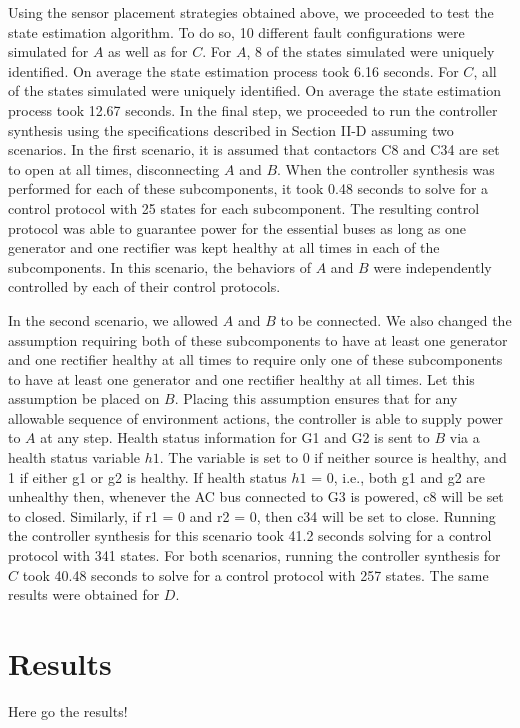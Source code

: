 \documentclass[journal]{IEEEtran}
\begin{document}
Using the sensor placement strategies obtained above, we proceeded to test the state estimation algorithm. To do so, 10 different fault configurations were simulated for $A$ as well as for $C$. For $A$, 8 of the states simulated were uniquely identified. On average the state estimation process took 6.16 seconds. For $C$, all of the states simulated were uniquely identified. On average the state estimation process took 12.67 seconds. In the final step, we proceeded to run the controller synthesis using the specifications described in Section II-D assuming two scenarios. In the first scenario, it is assumed that contactors C8 and C34 are set to open at all times, disconnecting $A$ and $B$. When the controller synthesis was performed for each of these subcomponents, it took 0.48 seconds to solve for a control protocol with 25 states for each subcomponent. The resulting control protocol was able to guarantee power for the essential buses as long as one generator and one rectifier was kept healthy at all times in each of the subcomponents. In this scenario, the behaviors of $A$ and $B$ were independently controlled by each of their control protocols. 

In the second scenario, we allowed $A$ and $B$ to be connected. We also changed the assumption requiring both of these subcomponents to have at least one generator and one rectifier healthy at all times to require only one of these subcomponents to have at least one generator and one rectifier healthy at all times. Let this assumption be placed on $B$. Placing this assumption ensures that for any allowable sequence of environment actions, the controller is able to supply power to $A$ at any step. Health status information for G1 and G2 is sent to $B$ via a health status variable $h1$. The variable is set to 0 if neither source is healthy, and 1 if either g1 or g2 is healthy. If health status $h1$ = 0, i.e., both g1 and g2 are unhealthy then, whenever the AC bus connected to G3 is powered, c8 will be set to closed. Similarly, if r1 = 0 and r2 = 0, then c34 will be set to close. Running the controller synthesis for this scenario took 41.2 seconds solving for a control protocol with 341 states. For both scenarios, running the controller synthesis for $C$ took 40.48 seconds to solve for a control protocol with 257 states. The same results were obtained for $D$.\fi 

\section{Results}
Here go the results!
\end{document}
